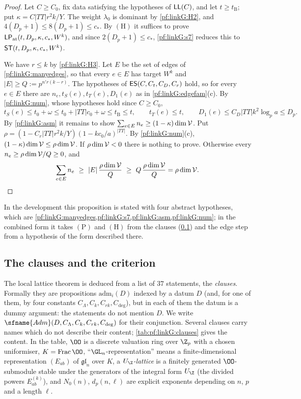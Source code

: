 \begin{proof}
Let $C\ge C_0$, fix data satisfying the hypotheses of $\mathsf{LL}(C)$, and let $t\ge t_{\mathrm B}$; put
$\kappa=C|TT|r^2k/Y$. The weight $\lambda_0$ is dominant by \ref{pf:linkG:H2}, and $4(D_p+1)\le8(D_p+1)\le c_*$. By
$(\mathrm H)$ it suffices to prove $\mathsf{LP}_{\mathrm{at}}(t,D_p,\kappa,c_*,W^k)$, and since $2(D_p+1)\le c_*$,
\cref{pf:linkG:s7} reduces this to $\mathsf{ST}(t,D_p,\kappa,c_*,W^k)$.

We have $r\le k$ by \ref{pf:linkG:H3}. Let $E$ be the set of edges of \cref{pf:linkG:manyedges}, so that every $e\in E$
has target $W^k$ and $|E|\ge Q:=p^{n'r(k-r)}$. The hypotheses of $\mathsf{ES}(C,C_t,C_D,C_r)$ hold, so for every $e\in E$
there are $n_e,t_S(e),t_T(e),D_1(e)$ as in \cref{pf:linkG:edgefam}(c). By \cref{pf:linkG:num}, whose hypotheses
hold since $C\ge C_0$,
\[
t_S(e)\le t_0+\omega\le t_0+|TT|c_0+\omega\le t_{\mathrm B}\le t,\qquad t_T(e)\le t,\qquad D_1(e)\le C_D|TT|k^2\log_pa\le D_p .
\]
By \cref{pf:linkG:asm} it remains to show $\sum_{e\in E}n_e\ge(1-\kappa)\dim\mathcal V$. Put
$\rho=(1-C_r|TT|r^2k/Y)(1-kc_0/a)^{|TT|}$. By \cref{pf:linkG:num}(c), $(1-\kappa)\dim\mathcal V\le\rho\dim\mathcal V$. If
$\rho\dim\mathcal V<0$ there is nothing to prove. Otherwise every $n_e\ge\rho\dim\mathcal V/Q\ge0$, and
\[
\sum_{e\in E}n_e\ \ge\ |E|\,\frac{\rho\dim\linkGV}{Q}\ \ge\ Q\,\frac{\rho\dim\linkGV}{Q}=\rho\dim\linkGV. \qedhere
\]
\end{proof}

In the development this proposition is stated with four abstract hypotheses, which are \cref{pf:linkG:manyedges,pf:linkG:s7,pf:linkG:asm,pf:linkG:num}; in the
combined form it takes $(\mathrm P)$ and $(\mathrm H)$ from the clauses (\cref{sec:pf:linkG:criterion})
and the edge step from a hypothesis of the form described there.

\subsection{The clauses and the criterion}\label{sec:pf:linkG:criterion}

The local lattice theorem is deduced from a list of $37$ statements, the \emph{clauses}. Formally they are
propositions $\mathrm{adm}_i(D)$ indexed by a datum $D$ (and, for one of them, by four constants
$C_{\Lambda},C_k,C_{rk},C_{\deg}$), but in each of them the datum is a dummy argument: the statements do not mention
$D$. We write $\sfname{Adm}(D,C_\Lambda,C_k,C_{rk},C_{\deg})$ for their conjunction. Several clauses
carry names which do not describe their content; \cref{tab:pf:linkG:clauses} gives the content. In the table,
$\OO$ is a discrete valuation ring over $\Z_p$ with a chosen uniformiser, $K=\mathrm{Frac}\,\OO$,
``$\GL_n$-representation'' means a finite-dimensional representation $(E_{ab})$ of $\mathfrak{gl}_n$ over $K$, a
\emph{$U_\Z$-lattice} is a finitely generated $\OO$-submodule stable under the generators of the integral form
$U_\Z$ (the divided powers $E_{ab}^{(k)}$), and $N_0(n)$, $d_p(n,\ell)$
are explicit exponents depending on $n$, $p$ and a length $\ell$.

